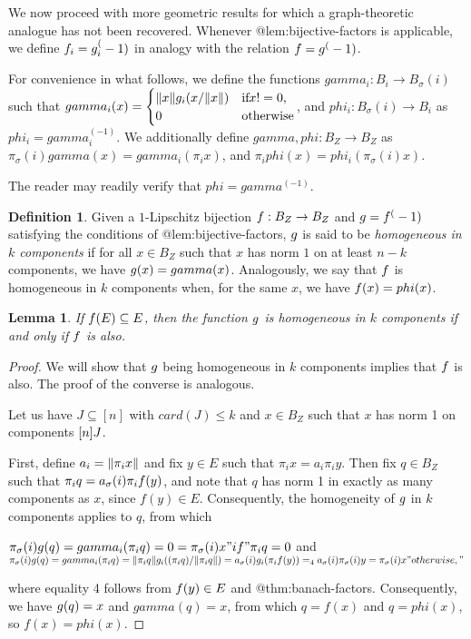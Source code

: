 \documentclass{amsart}
\newtheorem{lemma}{Lemma}
\theoremstyle{definition}
\newtheorem{definition}{Definition}
\begin{document}
We now proceed with more geometric results for which a graph-theoretic analogue has not been recovered. Whenever @lem:bijective-factors is applicable, we define $f_i = g_i^(-1)$ in analogy with the relation $f = g^(-1)$.

For convenience in what follows, we define the functions
$gamma_i : B_i \to B_\sigma(i)$ such that
$gamma_i (x) = \begin{cases}\norm{x} g_i (x/\norm{x}) & \text{if} x != 0,\\ 0 &\text{otherwise} \end{cases}$, and $phi_i : B_\sigma(i) \to B_i$ as $phi_i = gamma_i^(-1)$. We additionally define
$gamma, phi : B_Z \to B_Z$ as $\pi_\sigma(i) gamma(x) = gamma_i (\pi_i x)$, and
$\pi_i phi(x) = phi_i (\pi_\sigma(i) x)$.

The reader may readily verify that $phi = gamma^(-1)$.

\begin{definition}
    Given a $1$-Lipschitz bijection $f : B_Z \to B_Z$ and $g = f^(-1)$ satisfying the conditions of @lem:bijective-factors, $g$ is said to be \textit{homogeneous in $k$ components} if for all $x \in B_Z$ such that $x$ has norm $1$ on at least $n-k$ components, we have $g(x) = gamma(x)$. Analogously, we say that $f$ is homogeneous in $k$ components when, for the same $x$, we have $f(x) = phi(x)$.
\end{definition}

\begin{lemma} \label{lem:homogeneity-equiv}
    \annotation
    If $f(E) \subseteq E$, then
  the function $g$ is homogeneous in $k$ components if and only if
  $f$ is also.
\end{lemma}

\begin{proof}
    We will show that $g$ being homogeneous in $k$ components implies that $f$ is also. The proof of the converse is analogous.

    Let us have $J \subseteq [n]$ with $card(J) \leq k$ and $x \in B_Z$ such that $x$ has norm 1 on components $[n] \\ J$.
  
    First, define $a_i = \norm{\pi_i x}$ and fix $y \in E$ such that
    $\pi_i x = a_i \pi_i y$. Then fix $q \in B_Z$ such that $\pi_i q = a_\sigma(i) \pi_i f(y)$, and note that $q$ has norm 1 in exactly as many components as $x$, since $f(y) \in E$. Consequently, the homogeneity of $g$ in $k$ components applies to $q$, from which
  
    $ \pi_\sigma(i) g(q) = gamma_i (\pi_i q) = 0 = \pi_\sigma(i) x "      if"
    \pi_i q = 0 $
    and
    $ \pi_\sigma(i) g(q) = gamma_i (\pi_i q) = \norm{\pi_i q} g_i ((\pi_i q)/\norm{\pi_i q}) = a_\sigma(i) g_i (\pi_i f(y)) =_4 a_\sigma(i) \pi_\sigma(i) y = \pi_\sigma(i) x "    otherwise," $
  
    where equality 4 follows from $f(y) \in E$ and @thm:banach-factors.
    Consequently, we have $g(q) = x$ and $gamma(q) = x$, from which
    $q = f(x)$ and $q = phi(x)$, so $f(x) = phi(x)$.  
\end{proof}
\end{document}
